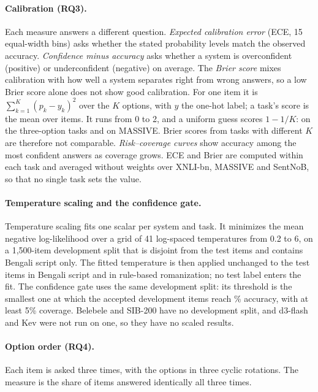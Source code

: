 \documentclass[11pt]{article}
\begin{document}
\paragraph{Calibration (RQ3).} Each measure answers a different question.
\emph{Expected calibration error} (ECE, 15 equal-width bins) asks whether the stated probability levels match the observed accuracy.
\emph{Confidence minus accuracy} asks whether a system is overconfident (positive) or underconfident (negative) on average.
The \emph{Brier score} mixes calibration with how well a system separates right from wrong answers, so a low Brier score alone does not show good calibration.
For one item it is $\sum_{k=1}^{K}(p_k-y_k)^2$ over the $K$ options, with $y$ the one-hot label; a task's score is the mean over items.
It runs from 0 to 2, and a uniform guess scores $1-1/K$: \brierUniXnli{} on the three-option tasks and \brierUniMas{} on MASSIVE.
Brier scores from tasks with different $K$ are therefore not comparable.
\emph{Risk--coverage curves} show accuracy among the most confident answers as coverage grows.
ECE and Brier are computed within each task and averaged without weights over XNLI-bn, MASSIVE and SentNoB, so that no single task sets the value.

\paragraph{Temperature scaling and the confidence gate.}
Temperature scaling fits one scalar per system and task.
It minimizes the mean negative log-likelihood over a grid of 41 log-spaced temperatures from 0.2 to 6, on a 1,500-item development split that is disjoint from the test items and contains Bengali script only.
The fitted temperature is then applied unchanged to the test items in Bengali script and in rule-based romanization; no test label enters the fit.
The confidence gate uses the same development split: its threshold is the smallest one at which the accepted development items reach \gateTarget\% accuracy, with at least 5\% coverage.
Belebele and SIB-200 have no development split, and d3-flash and Kev were not run on one, so they have no scaled results.

\paragraph{Option order (RQ4).} Each item is asked three times, with the options in three cyclic rotations. The measure is the share of items answered identically all three times.
\end{document}
